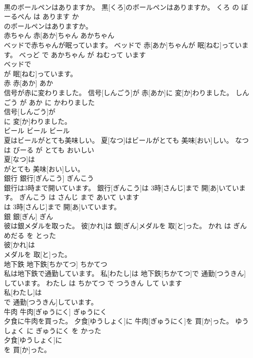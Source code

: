 \documentclass[8pt]{extreport}
\begin{document}
\begin{CJK}{UTF8}{min}
\\	黒のボールペンはありますか。	黒[くろ]のボールペンはありますか。	くろ の ぼーるぺん は あります か	
\\	のボールペンはありますか。			
\\	赤ちゃん	赤[あか]ちゃん	あかちゃん	
\\	ベッドで赤ちゃんが眠っています。	ベッドで 赤[あか]ちゃんが 眠[ねむ]っています。	べっど で あかちゃん が ねむって います	
\\	ベッドで
\\	が 眠[ねむ]っています。			
\\	赤	赤[あか]	あか	
\\	信号が赤に変わりました。	信号[しんごう]が 赤[あか]に 変[か]わりました。	しんごう が あか に かわりました	
\\	信号[しんごう]が
\\	に 変[か]わりました。			
\\	ビール	ビール	ビール	
\\	夏はビールがとても美味しい。	夏[なつ]はビールがとても 美味[おい]しい。	なつ は びーる が とても おいしい	
\\	夏[なつ]は
\\	がとても 美味[おい]しい。			
\\	銀行	銀行[ぎんこう]	ぎんこう	
\\	銀行は3時まで開いています。	銀行[ぎんこう]は 3時[さんじ]まで 開[あ]いています。	ぎんこう は さんじ まで あいて います	
\\	は 3時[さんじ]まで 開[あ]いています。			
\\	銀	銀[ぎん]	ぎん	
\\	彼は銀メダルを取った。	彼[かれ]は 銀[ぎん]メダルを 取[と]った。	かれ は ぎんめだる を とった	
\\	彼[かれ]は
\\	メダルを 取[と]った。			
\\	地下鉄	地下鉄[ちかてつ]	ちかてつ	
\\	私は地下鉄で通勤しています。	私[わたし]は 地下鉄[ちかてつ]で 通勤[つうきん]しています。	わたし は ちかてつ で つうきん して います	
\\	私[わたし]は
\\	で 通勤[つうきん]しています。			
\\	牛肉	牛肉[ぎゅうにく]	ぎゅうにく	
\\	夕食に牛肉を買った。	夕食[ゆうしょく]に 牛肉[ぎゅうにく]を 買[か]った。	ゆうしょく に ぎゅうにく を かった	
\\	夕食[ゆうしょく]に
\\	を 買[か]った。			

\end{CJK}
\end{document}
